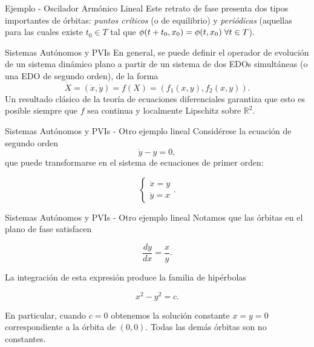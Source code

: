 \documentclass{beamer}
\newcommand{\R}{{\ensuremath{\mathbb{R}}}}
\begin{document}
\begin{frame}{Ejemplo - Oscilador Armónico Lineal}
Este retrato de fase presenta dos tipos importantes de órbitas: \emph{puntos críticos} (o de equilibrio) y \emph{periódicas} (aquellas para las cuales existe $t_0 \in T$ tal que $\phi(t+t_0, x_0) = \phi(t,x_0) \hspace{0.1cm} \forall t \in T$).
\end{frame}

\begin{frame}{Sistemas Autónomos y PVIs}
En general, se puede definir el operador de evolución de un sistema dinámico plano a partir de un sistema de dos EDOs simultáneas (o una EDO de segundo orden), de la forma
$$\dot{X} = (\dot{x}, \dot{y}) = f(X) = (f_1(x,y), f_2(x,y)). $$
Un resultado clásico de la teoría de ecuaciones diferenciales garantiza que esto es posible siempre que $f$ sea continua y localmente Lipschitz sobre $\R^2$.
\end{frame}

\begin{frame}{Sistemas Autónomos y PVIs - Otro ejemplo lineal}
Considérese la ecuación de segundo orden $$ \ddot{y} - y = 0,$$ que puede transformarse en el sistema de ecuaciones de primer orden:

$$
\left \{
\begin{array}{l}
	\dot{x} = y \\
	\dot{y} = x
\end{array} \right..
$$
\end{frame}

\begin{frame}{Sistemas Autónomos y PVIs - Otro ejemplo lineal}
Notamos que las órbitas en el plano de fase satisfacen

$$ \dfrac{dy}{dx} = \frac{x}{y}. $$

La integración de esta expresión produce la familia de hipérbolas

$$ x^2 - y^2 = c.$$

En particular, cuando $c = 0$ obtenemos la solución constante $x = y = 0$ correspondiente a la órbita de $(0,0)$. Todas las demás órbitas son no constantes.
\end{frame}
\end{document}

